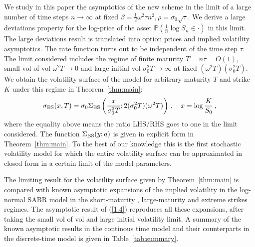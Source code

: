 \documentclass[11pt]{article}
\numberwithin{equation}{section}
\theoremstyle{plain}
\begin{document}
We study in this paper the asymptotics of the new scheme in the limit of a large
number of time steps $n\to \infty$ at fixed 
$\beta = \frac12\omega^2 \tau n^2,\rho = \sigma_0 \sqrt{\tau}$. 
We derive a large deviations property for the log-price of the 
asset $\mathbb{P} (\frac{1}{n}\log S_n \in \cdot)$ in this limit. 
The large deviations result is translated into option prices 
and implied volatility asymptotics. 
The rate function turns out to be independent of the time step $\tau$.
The limit considered includes the regime of 
finite maturity $T = n\tau = O(1)$, small vol of vol  
$\omega^2 T \to 0$ and large initial vol $\sigma_0^2 T \to \infty$ at 
fixed $(\omega^2 T)(\sigma_0^2 T)$. 
We obtain the volatility surface of the model for arbitrary 
maturity $T$ and strike $K$ under this regime in Theorem~\ref{thm:main}:
\begin{equation}\label{1.4}
\sigma_{\rm BS}(x,T)= 
\sigma_{0}\Sigma_{\rm BS}\left( \frac{x}{\sigma_0^2 T};
2(\sigma_0^2 T)(\omega^2 T)\right)\,,\quad x = \log\frac{K}{S_0}\,,
\end{equation}
where the equality above means the ratio LHS/RHS goes to one in the limit 
considered. 
The function $\Sigma_{\rm BS}(y;a)$ is given in explicit form in 
Theorem~\ref{thm:main}. To the best of our knowledge this is the first 
stochastic volatility model for which the entire volatility surface can be 
approximated in closed form in a certain limit of the model parameters.

The limiting result for the volatility surface given by Theorem~\ref{thm:main}
is compared with known asymptotic expansions of the implied volatility in the
log-normal SABR model in the short-maturity \cite{SABR,HLbook,PaulotSABR}, 
large-maturity \cite{Lewis2002,Lewis,Forde1} and
extreme strikes \cite{GSHW} regimes. The asymptotic result of (\ref{1.4}) 
reproduces all these expansions, after taking
the small vol of vol and large initial volatility limit. 
A summary of the known asymptotic results in the continous
time model and their counterparts in the discrete-time model is given in 
Table~\ref{tab:summary}.
\end{document}
